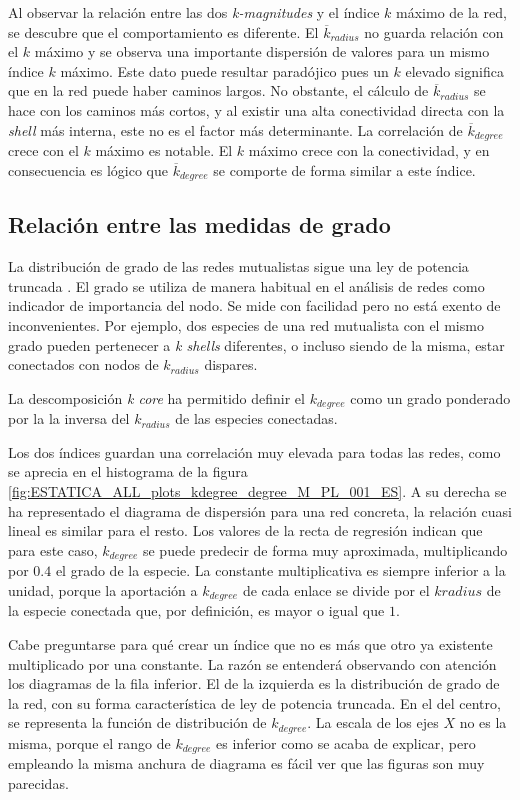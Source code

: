 Al observar la relación entre las dos \textit{k-magnitudes} y el índice $k$ máximo de la red, se descubre que el comportamiento es diferente. El $\overline{k}_{radius}$ no guarda relación con el $k$ máximo y se observa una importante dispersión de valores para un mismo índice $k$ máximo. Este dato puede resultar paradójico pues un $k$ elevado significa que en la red puede haber caminos largos. No obstante, el cálculo de $\overline{k}_{radius}$ se hace con los caminos más cortos, y al existir una alta conectividad directa con la \textit{shell} más interna, este no es el factor más determinante. La correlación de $\overline{k}_{degree}$ crece con el $k$ máximo es notable. El $k$ máximo crece con la conectividad, y en consecuencia es lógico que $\overline{k}_{degree}$ se comporte de forma similar a este índice.

\subsection{Relación entre las medidas de grado}

La distribución de grado de las redes mutualistas sigue una ley de potencia truncada \cite{jordano2003invariant,vazquez2005degree}. El grado se utiliza de manera habitual en el análisis de redes como indicador de importancia del nodo. Se mide con facilidad pero no está exento de inconvenientes. Por ejemplo, dos especies de una red mutualista con el mismo grado pueden pertenecer a \textit{k shells} diferentes, o incluso siendo de la misma, estar conectados con nodos de $k_{radius}$ dispares.

La descomposición \textit{k core} ha permitido definir el $k_{degree}$ como un grado ponderado por la la inversa del $k_{radius}$ de las especies conectadas. 

Los dos índices guardan una correlación muy elevada para todas las redes, como se aprecia en el histograma de la figura \ref{fig:ESTATICA_ALL_plots_kdegree_degree_M_PL_001_ES}. A su derecha se ha representado el diagrama de dispersión para una red concreta, la relación cuasi lineal es similar para el resto. Los valores de la recta de regresión indican que para este caso, $k_{degree}$ se puede predecir de forma muy aproximada, multiplicando por $0.4$ el grado de la especie. La constante multiplicativa es siempre inferior a la unidad, porque la aportación a $k_{degree}$ de cada enlace se divide por el $k{radius}$ de la especie conectada que, por definición, es mayor o igual que $1$. 

Cabe preguntarse para qué crear un índice que no es más que otro ya existente multiplicado por una constante. La razón se entenderá observando con atención los diagramas de la fila inferior. El de la izquierda es la distribución de grado de la red, con su forma característica de ley de potencia truncada. En el del centro, se representa la función de distribución de $k_{degree}$. La escala de los ejes $X$ no es la misma, porque el rango de $k_{degree}$ es inferior como se acaba de explicar, pero empleando la misma anchura de diagrama es fácil ver que las figuras son muy parecidas.

